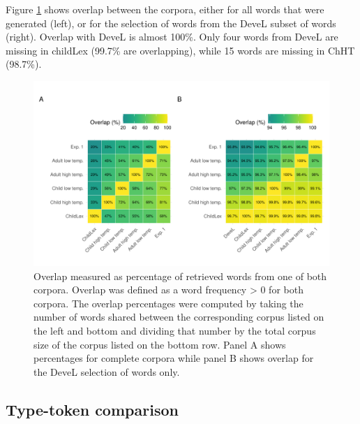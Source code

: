 \documentclass[doc, a4paper, anonymous]{apa7}
\begin{document}
Figure \ref{fig:heatmaps} shows overlap between the corpora, either for all words that were generated (left), or for the selection of words from the DeveL subset of words (right). Overlap with DeveL is almost 100\%. Only four words from DeveL are missing in childLex (99.7\% are overlapping), while 15 words are missing in ChHT (98.7\%).

\begin{figure}[!htbp]
    \includegraphics[width = 0.8\paperwidth]{figures/heatmaps.pdf}
    \caption{Overlap measured as percentage of retrieved words from one of both corpora. Overlap was defined as a word frequency > 0 for both corpora. The overlap percentages were computed by taking the number of words shared between the corresponding corpus listed on the left and bottom and dividing that number by the total corpus size of the corpus listed on the bottom row. Panel A shows percentages for complete corpora while panel B shows overlap for the DeveL selection of words only.}
    \label{fig:heatmaps}
\end{figure}

\clearpage


\subsection{Type-token comparison}
\end{document}
